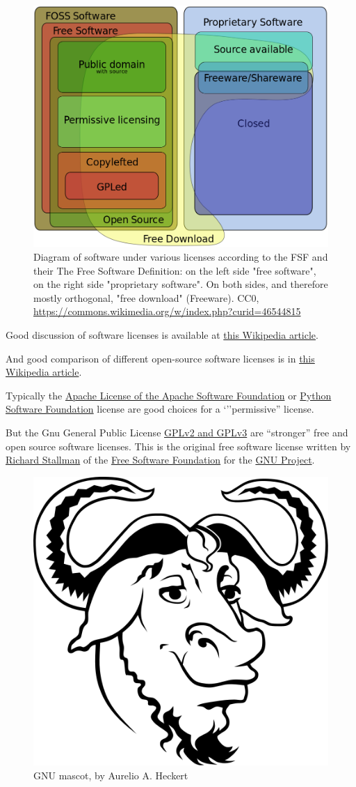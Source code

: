 \documentclass[11pt]{article} %
\begin{document}
\begin{figure}[h]
  \centering
  \includegraphics[width=0.5\linewidth]{figs/Software_Categories_expanded}
  \caption{Diagram of software under various licenses according to the FSF and their The Free Software Definition: on the left side "free software", on the right side "proprietary software". On both sides, and therefore mostly orthogonal, "free download" (Freeware). CC0, \href{https://commons.wikimedia.org/w/index.php?curid=46544815}{https://commons.wikimedia.org/w/index.php?curid=46544815}}
  \label{fig:software-licenses}
\end{figure}

Good discussion of software licenses is available at \href{https://en.wikipedia.org/wiki/Software_license}{this Wikipedia article}.

And good comparison of different open-source software licenses is in \href{https://en.wikipedia.org/wiki/Comparison_of_free_and_open-source_software_licenses}{this Wikipedia article}.

Typically the \href{https://en.wikipedia.org/wiki/Apache_License}{Apache License of the Apache Software Foundation} or \href{https://en.wikipedia.org/wiki/Python_Software_Foundation_License}{Python Software Foundation} license are good choices for a `''permissive'' license.  

But the Gnu General Public License \href{https://en.wikipedia.org/wiki/GNU_General_Public_License}{GPLv2 and GPLv3}  are ``stronger'' free and open source software licenses. This is the original free software license written by \href{https://en.wikipedia.org/wiki/Richard_Stallman}{Richard Stallman}  of the \href{https://en.wikipedia.org/wiki/Free_Software_Foundation}{Free Software Foundation} for the \href{https://en.wikipedia.org/wiki/GNU_Project}{GNU Project}.

\begin{figure}[h]
  \centering
  \includegraphics[width=0.25\linewidth]{figs/Heckert_GNU_white}
  \caption{GNU mascot, by Aurelio A. Heckert}
  \label{fig:gnu-mascot}
\end{figure}
\end{document}

